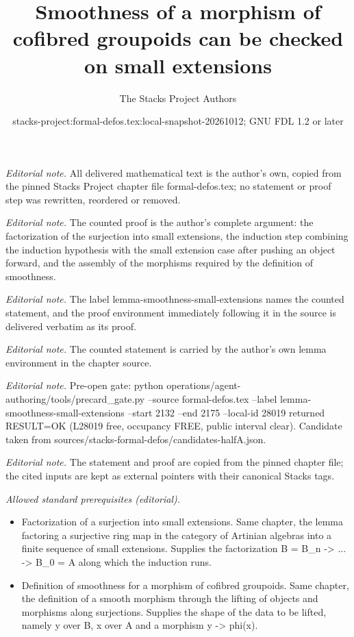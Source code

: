 \documentclass[10pt,a4paper]{amsart}
\title{Smoothness of a morphism of cofibred groupoids can be checked on small extensions}
\author{The Stacks Project Authors}
\date{stacks-project:formal-defos.tex:local-snapshot-20261012; GNU FDL 1.2 or later}
\theoremstyle{plain}
\theoremstyle{definition}
\theoremstyle{remark}
\numberwithin{equation}{subsection}
\begin{document}
\maketitle
\noindent\textit{Editorial note.} All delivered mathematical text is the author's own, copied from the pinned Stacks Project chapter file formal-defos.tex; no statement or proof step was rewritten, reordered or removed.\par\medskip
\noindent\textit{Editorial note.} The counted proof is the author's complete argument: the factorization of the surjection into small extensions, the induction step combining the induction hypothesis with the small extension case after pushing an object forward, and the assembly of the morphisms required by the definition of smoothness.\par\medskip
\noindent\textit{Editorial note.} The label lemma-smoothness-small-extensions names the counted statement, and the proof environment immediately following it in the source is delivered verbatim as its proof.\par\medskip
\noindent\textit{Editorial note.} The counted statement is carried by the author's own lemma environment in the chapter source.\par\medskip
\noindent\textit{Editorial note.} Pre-open gate: python operations/agent-authoring/tools/precard\_gate.py --source formal-defos.tex --label lemma-smoothness-small-extensions --start 2132 --end 2175 --local-id 28019 returned RESULT=OK (L28019 free, occupancy FREE, public interval clear). Candidate taken from sources/stacks-formal-defos/candidates-halfA.json.\par\medskip
\noindent\textit{Editorial note.} The statement and proof are copied from the pinned chapter file; the cited inputs are kept as external pointers with their canonical Stacks tags.\par\medskip
\noindent\textit{Allowed standard prerequisites (editorial).}\begin{itemize}
\item Factorization of a surjection into small extensions. Same chapter, the lemma factoring a surjective ring map in the category of Artinian algebras into a finite sequence of small extensions. Supplies the factorization B = B\_n -> ... -> B\_0 = A along which the induction runs.
\item Definition of smoothness for a morphism of cofibred groupoids. Same chapter, the definition of a smooth morphism through the lifting of objects and morphisms along surjections. Supplies the shape of the data to be lifted, namely y over B, x over A and a morphism y -> phi(x).
\end{itemize}\medskip
\end{document}
